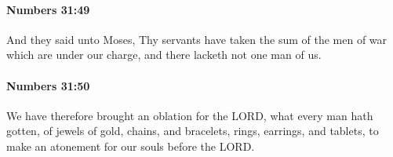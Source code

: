 		\paragraph{Numbers 31:49} %
			\label{NUMBERS-31-49}

			And they said unto Moses, Thy servants have taken the sum of the men of war which are under our charge, and there lacketh not one man of us.


		\paragraph{Numbers 31:50} %
			\label{NUMBERS-31-50}

			We have therefore brought an oblation for the LORD, what every man hath gotten, of jewels of gold, chains, and bracelets, rings, earrings, and tablets, to make an atonement for our souls before the LORD.


